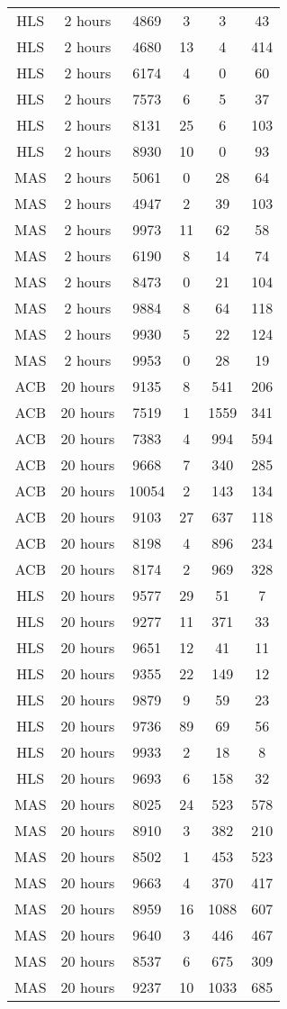 \begin{center}
\begin{longtable}{cccccc}
HLS	&	2 hours	&	4869	&	3	&	3	&	43	\\
HLS	&	2 hours	&	4680	&	13	&	4	&	414	\\
HLS	&	2 hours	&	6174	&	4	&	0	&	60	\\
HLS	&	2 hours	&	7573	&	6	&	5	&	37	\\
HLS	&	2 hours	&	8131	&	25	&	6	&	103	\\
HLS	&	2 hours	&	8930	&	10	&	0	&	93	\\
MAS	&	2 hours	&	5061	&	0	&	28	&	64	\\
MAS	&	2 hours	&	4947	&	2	&	39	&	103	\\
MAS	&	2 hours	&	9973	&	11	&	62	&	58	\\
MAS	&	2 hours	&	6190	&	8	&	14	&	74	\\
MAS	&	2 hours	&	8473	&	0	&	21	&	104	\\
MAS	&	2 hours	&	9884	&	8	&	64	&	118	\\
MAS	&	2 hours	&	9930	&	5	&	22	&	124	\\
MAS	&	2 hours	&	9953	&	0	&	28	&	19	\\
ACB	&	20 hours	&	9135	&	8	&	541	&	206	\\
ACB	&	20 hours	&	7519	&	1	&	1559	&	341	\\
ACB	&	20 hours	&	7383	&	4	&	994	&	594	\\
ACB	&	20 hours	&	9668	&	7	&	340	&	285	\\
ACB	&	20 hours	&	10054	&	2	&	143	&	134	\\
ACB	&	20 hours	&	9103	&	27	&	637	&	118	\\
ACB	&	20 hours	&	8198	&	4	&	896	&	234	\\
ACB	&	20 hours	&	8174	&	2	&	969	&	328	\\
HLS	&	20 hours	&	9577	&	29	&	51	&	7	\\
HLS	&	20 hours	&	9277	&	11	&	371	&	33	\\
HLS	&	20 hours	&	9651	&	12	&	41	&	11	\\
HLS	&	20 hours	&	9355	&	22	&	149	&	12	\\
HLS	&	20 hours	&	9879	&	9	&	59	&	23	\\
HLS	&	20 hours	&	9736	&	89	&	69	&	56	\\
HLS	&	20 hours	&	9933	&	2	&	18	&	8	\\
HLS	&	20 hours	&	9693	&	6	&	158	&	32	\\
MAS	&	20 hours	&	8025	&	24	&	523	&	578	\\
MAS	&	20 hours	&	8910	&	3	&	382	&	210	\\
MAS	&	20 hours	&	8502	&	1	&	453	&	523	\\
MAS	&	20 hours	&	9663	&	4	&	370	&	417	\\
MAS	&	20 hours	&	8959	&	16	&	1088	&	607	\\
MAS	&	20 hours	&	9640	&	3	&	446	&	467	\\
MAS	&	20 hours	&	8537	&	6	&	675	&	309	\\
MAS	&	20 hours	&	9237	&	10	&	1033	&	685	\\

\end{longtable}    
\end{center}